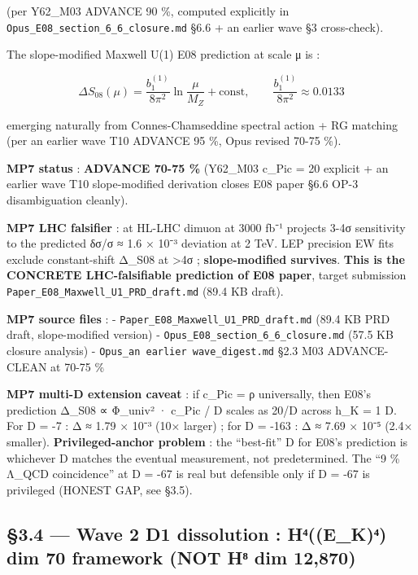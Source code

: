 \documentclass[
  11pt,
  a4paper,
]{article}
\begin{document}
(per Y62\_M03 ADVANCE 90 \%, computed explicitly in \texttt{Opus\_E08\_section\_6\_6\_closure.md} §6.6 + an earlier wave §3 cross-check).

The slope-modified Maxwell U(1) E08 prediction at scale μ is :

\[
\Delta S_{08}(\mu) = \frac{b_1^{(1)}}{8\pi^2} \ln\frac{\mu}{M_Z} + \text{const}, \qquad \frac{b_1^{(1)}}{8\pi^2} \approx 0.0133
\]

emerging naturally from Connes-Chamseddine spectral action + RG matching (per an earlier wave T10 ADVANCE 95 \%, Opus revised 70-75 \%).

\textbf{MP7 status} : \textbf{ADVANCE 70-75 \%} (Y62\_M03 c\_Pic = 20 explicit + an earlier wave T10 slope-modified derivation closes E08 paper §6.6 OP-3 disambiguation cleanly).

\textbf{MP7 LHC falsifier} : at HL-LHC dimuon at 3000 fb⁻¹ projects 3-4σ sensitivity to the predicted δσ/σ ≈ 1.6 × 10⁻³ deviation at 2 TeV. LEP precision EW fits exclude constant-shift Δ\_S08 at \textgreater4σ ; \textbf{slope-modified survives}. \textbf{This is the CONCRETE LHC-falsifiable prediction of E08 paper}, target submission \texttt{Paper\_E08\_Maxwell\_U1\_PRD\_draft.md} (89.4 KB draft).

\textbf{MP7 source files} :
- \texttt{Paper\_E08\_Maxwell\_U1\_PRD\_draft.md} (89.4 KB PRD draft, slope-modified version)
- \texttt{Opus\_E08\_section\_6\_6\_closure.md} (57.5 KB closure analysis)
- \texttt{Opus\_an earlier wave\_digest.md} §2.3 M03 ADVANCE-CLEAN at 70-75 \%

\textbf{MP7 multi-D extension caveat} : if c\_Pic = ρ universally, then E08's prediction Δ\_S08 ∝ Φ\_univ² · c\_Pic / \textbar D\textbar{} scales as 20/\textbar D\textbar{} across h\_K = 1 D. For D = -7 : Δ ≈ 1.79 × 10⁻³ (10× larger) ; for D = -163 : Δ ≈ 7.69 × 10⁻⁵ (2.4× smaller). \textbf{Privileged-anchor problem} : the ``best-fit'' D for E08's prediction is whichever D matches the eventual measurement, not predetermined. The ``9 \% Λ\_QCD coincidence'' at D = -67 is real but defensible only if D = -67 is privileged (HONEST GAP, see §3.5).

\hypertarget{wave-2-d1-dissolution-hux2074e_kux2074-dim-70-framework-not-hux2078-dim-12870}{%
\subsection{§3.4 --- Wave 2 D1 dissolution : H⁴((E\_K)⁴) dim 70 framework (NOT H⁸ dim 12,870)}\label{wave-2-d1-dissolution-hux2074e_kux2074-dim-70-framework-not-hux2078-dim-12870}}
\end{document}
